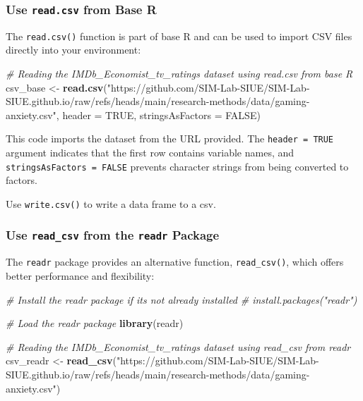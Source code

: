\documentclass[
]{book}
\newenvironment{Shaded}{\begin{snugshade}}{\end{snugshade}}
\newcommand{\AttributeTok}[1]{\textcolor[rgb]{0.13,0.29,0.53}{#1}}
\newcommand{\CommentTok}[1]{\textcolor[rgb]{0.56,0.35,0.01}{\textit{#1}}}
\newcommand{\ConstantTok}[1]{\textcolor[rgb]{0.56,0.35,0.01}{#1}}
\newcommand{\FunctionTok}[1]{\textcolor[rgb]{0.13,0.29,0.53}{\textbf{#1}}}
\newcommand{\NormalTok}[1]{#1}
\newcommand{\OtherTok}[1]{\textcolor[rgb]{0.56,0.35,0.01}{#1}}
\newcommand{\StringTok}[1]{\textcolor[rgb]{0.31,0.60,0.02}{#1}}
\begin{document}
\subsubsection*{\texorpdfstring{Use \texttt{read.csv} from Base R}{Use read.csv from Base R}}\label{use-read.csv-from-base-r}

The \texttt{read.csv()} function is part of base R and can be used to import CSV files directly into your environment:

\begin{Shaded}
\begin{Highlighting}[]
\CommentTok{\# Reading the IMDb\_Economist\_tv\_ratings dataset using read.csv from base R}
\NormalTok{csv\_base }\OtherTok{\textless{}{-}} \FunctionTok{read.csv}\NormalTok{(}\StringTok{"https://github.com/SIM{-}Lab{-}SIUE/SIM{-}Lab{-}SIUE.github.io/raw/refs/heads/main/research{-}methods/data/gaming{-}anxiety.csv"}\NormalTok{, }\AttributeTok{header =} \ConstantTok{TRUE}\NormalTok{, }\AttributeTok{stringsAsFactors =} \ConstantTok{FALSE}\NormalTok{)}
\end{Highlighting}
\end{Shaded}

This code imports the dataset from the URL provided. The \texttt{header\ =\ TRUE} argument indicates that the first row contains variable names, and \texttt{stringsAsFactors\ =\ FALSE} prevents character strings from being converted to factors.

Use \texttt{write.csv()} to write a data frame to a csv.

\subsubsection*{\texorpdfstring{Use \texttt{read\_csv} from the \texttt{readr} Package}{Use read\_csv from the readr Package}}\label{use-read_csv-from-the-readr-package}

The \texttt{readr} package provides an alternative function, \texttt{read\_csv()}, which offers better performance and flexibility:

\begin{Shaded}
\begin{Highlighting}[]
\CommentTok{\# Install the readr package if it\textquotesingle{}s not already installed}
\CommentTok{\# install.packages("readr")}

\CommentTok{\# Load the readr package}
\FunctionTok{library}\NormalTok{(readr)}

\CommentTok{\# Reading the IMDb\_Economist\_tv\_ratings dataset using read\_csv from readr}
\NormalTok{csv\_readr }\OtherTok{\textless{}{-}} \FunctionTok{read\_csv}\NormalTok{(}\StringTok{"https://github.com/SIM{-}Lab{-}SIUE/SIM{-}Lab{-}SIUE.github.io/raw/refs/heads/main/research{-}methods/data/gaming{-}anxiety.csv"}\NormalTok{)}
\end{Highlighting}
\end{Shaded}
\end{document}
